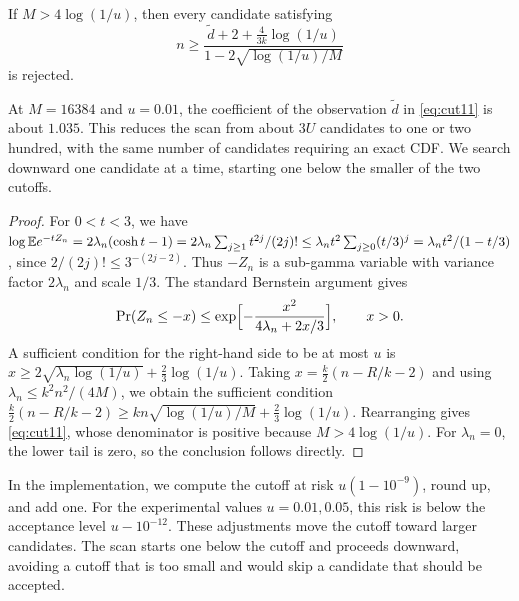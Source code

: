 \begin{proposition}\label{prop:cut11}
If $M>4\log(1/u)$, then every candidate satisfying
\begin{equation}
n\ge\frac{\widetilde d+2+\frac{4}{3k}\log(1/u)}{1-2\sqrt{\log(1/u)/M}}\label{eq:cut11}
\end{equation}
is rejected.
\end{proposition}

At $M=16384$ and $u=0.01$, the coefficient of the observation $\widetilde d$ in \eqref{eq:cut11} is about $1.035$. This reduces the scan from about $3U$ candidates to one or two hundred, with the same number of candidates requiring an exact CDF. We search downward one candidate at a time, starting one below the smaller of the two cutoffs.

\begin{proof}
For $0<t<3$, we have $\log\mathbb E e^{-tZ_n}=2\lambda_n(\cosh t-1)=2\lambda_n\sum_{j\ge1}t^{2j}/(2j)!\le\lambda_nt^2\sum_{j\ge0}(t/3)^{j}=\lambda_nt^2/(1-t/3)$, since $2/(2j)!\le3^{-(2j-2)}$. Thus $-Z_n$ is a sub-gamma variable with variance factor $2\lambda_n$ and scale $1/3$. The standard Bernstein argument \cite{boucheron2013concentration} gives
\begin{equation*}
\Pr(Z_n\le-x)\le\exp\Bigl[-\frac{x^2}{4\lambda_n+2x/3}\Bigr],\qquad x>0.
\end{equation*}
A sufficient condition for the right-hand side to be at most $u$ is $x\ge2\sqrt{\lambda_n\log(1/u)}+\frac23\log(1/u)$. Taking $x=\frac k2(n-R/k-2)$ and using $\lambda_n\le k^2n^2/(4M)$, we obtain the sufficient condition $\frac k2(n-R/k-2)\ge kn\sqrt{\log(1/u)/M}+\frac23\log(1/u)$. Rearranging gives \eqref{eq:cut11}, whose denominator is positive because $M>4\log(1/u)$. For $\lambda_n=0$, the lower tail is zero, so the conclusion follows directly.
\end{proof}

In the implementation, we compute the cutoff at risk $u(1-10^{-9})$, round up, and add one. For the experimental values $u=0.01,0.05$, this risk is below the acceptance level $u-10^{-12}$. These adjustments move the cutoff toward larger candidates. The scan starts one below the cutoff and proceeds downward, avoiding a cutoff that is too small and would skip a candidate that should be accepted.

